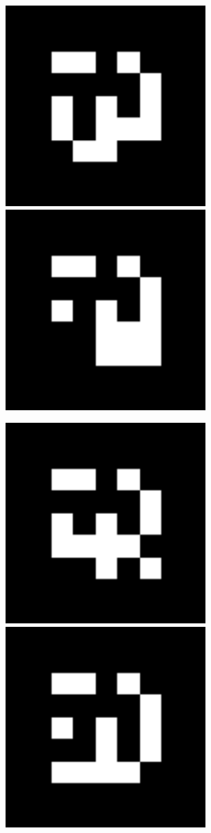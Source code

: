 \documentclass[10pt,letterpaper]{article}
\begin{document}
\includegraphics[width=3in]{MarkerData_117.png}
\includegraphics[width=3in]{MarkerData_118.png}


\includegraphics[width=3in]{MarkerData_119.png}
\includegraphics[width=3in]{MarkerData_120.png}
\end{document}
